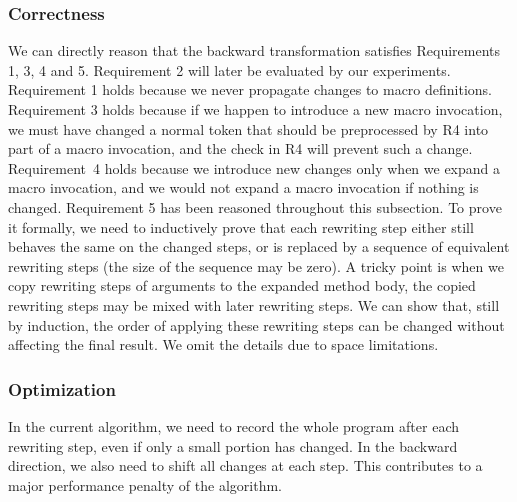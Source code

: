 \subsubsection{Correctness}\label{sec:correctness}
We can directly reason that the backward transformation satisfies
Requirements 1, 3, 4 and 5. Requirement 2 will later be evaluated by
our experiments. Requirement 1 holds because we never propagate
changes to macro definitions. Requirement 3 holds because if we happen
to introduce a new macro invocation, we must have changed a normal 
token that should be preprocessed by R4 into part of a macro
invocation, and the check in R4 will prevent such a change.
Requirement~4 holds because we introduce new changes only when we
expand a macro invocation, and we would not expand a macro invocation
if nothing is changed. Requirement 5 has been reasoned throughout this
subsection. To prove it formally, we need to inductively prove that each
rewriting step either still behaves the same on the changed steps, or
is replaced by a sequence of equivalent rewriting steps (the size of
the sequence may be zero). A tricky point is when we copy rewriting
steps of arguments to the
expanded method body, the copied rewriting steps may be
mixed with later rewriting steps. We can show that, still by
induction, the order of applying these rewriting steps can be changed
without affecting the final result. We omit the details due to space
limitations.

\subsubsection{Optimization}\label{sec:optimization}
In the current algorithm, we need to record the whole program after
each rewriting step, even if only a small portion has changed. In the
backward direction, we also need to shift all changes at each step.
This contributes to a major performance penalty of the algorithm.

